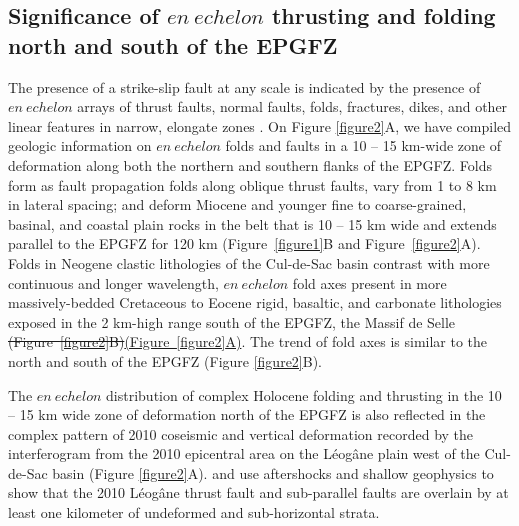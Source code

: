 \documentclass[linenumbers,draft]{agujournal}
\providecommand{\DIFdel}[1]{{\protect\color{red}\sout{#1}}}                      %
\providecommand{\DIFaddbegin}{} %
\providecommand{\DIFaddend}{} %
\providecommand{\DIFdelbegin}{} %
\providecommand{\DIFdelend}{} %
\begin{document}
\subsection{Significance of $en~echelon$ thrusting and folding north and south of the EPGFZ}
The presence of a strike-slip fault at any scale is indicated by the presence of $en~echelon$ arrays of thrust faults, normal faults, folds, fractures, dikes, and other linear features in narrow, elongate zones \citep{sylvester1988strike}. On Figure \ref{figure2}A, we have compiled geologic information on $en~echelon$ folds and faults in a 10 -- 15 km-wide zone of deformation along both the northern and southern flanks of the EPGFZ. Folds form as fault propagation folds along oblique thrust faults, vary from 1 to 8 km in lateral spacing; and deform Miocene and younger fine to coarse-grained, basinal, and coastal plain rocks in the belt that is 10 -- 15 km wide and extends parallel to the EPGFZ for 120 km (Figure~\ref{figure1}B and Figure~\ref{figure2}A). Folds in Neogene clastic lithologies of the Cul-de-Sac basin contrast with more continuous and longer wavelength, $en~echelon$ fold axes present in more massively-bedded Cretaceous to Eocene rigid, basaltic, and carbonate lithologies exposed in the 2 km-high range south of the EPGFZ, the Massif de Selle \DIFdelbegin \DIFdel{(Figure~\ref{figure2}B)}\DIFdelend \DIFaddbegin \ul{(Figure~{\ref{figure2}}A)}\DIFaddend . The trend of fold axes is similar to the north and south of the EPGFZ (Figure \ref{figure2}B). 

The $en~echelon$ distribution of complex Holocene folding and thrusting in the 10 -- 15 km wide zone of deformation north of the EPGFZ is also reflected in the complex pattern of 2010 coseismic and vertical deformation recorded by the interferogram from the 2010 epicentral area on the L\'eog\^ane plain west of the Cul-de-Sac basin \citep{hayes2010complex,hashimoto2011fan,bilham2013remote} (Figure \ref{figure2}A). \citet{douilly2013crustal,douilly2015three} and \citet{kocel2016near} use aftershocks and shallow geophysics to show that the 2010 L\'eog\^ane thrust fault and sub-parallel faults are overlain by at least one kilometer of undeformed and sub-horizontal strata.
\end{document}

